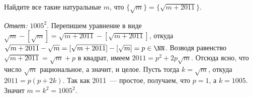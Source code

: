 \problem
Найдите все такие натуральные $m$, что
$\{ \sqrt{m} \} = \{ \sqrt{m+2011} \}$.

\solution
\emph{Ответ:} $1005^2$.
Перепишем уравнение в виде
$\sqrt{m} - [\sqrt{m}] = \sqrt{m + 2011} - [\sqrt{m + 2011}]$,
откуда
\(
    \sqrt{m + 2011} - \sqrt{m}
=
    [\sqrt{m + 2011}] - [\sqrt{m}]
=
    p \in \NN
\).
Возводя равенство $\sqrt{m + 2011} = \sqrt{m} + p$ в квадрат, имеем
$2011 = p^2 + 2 p \sqrt{m}$.
Отсюда ясно, что число $\sqrt{m}$ рациональное, а значит, и целое.
Пусть тогда $k = \sqrt{m}$, откуда $2011 = p (p + 2 k)$.
Так как 2011~--- простое, получаем, что $p=1$, а $k = 1005$.
Значит $m = k^2 = 1005^2$.

\endproblem
